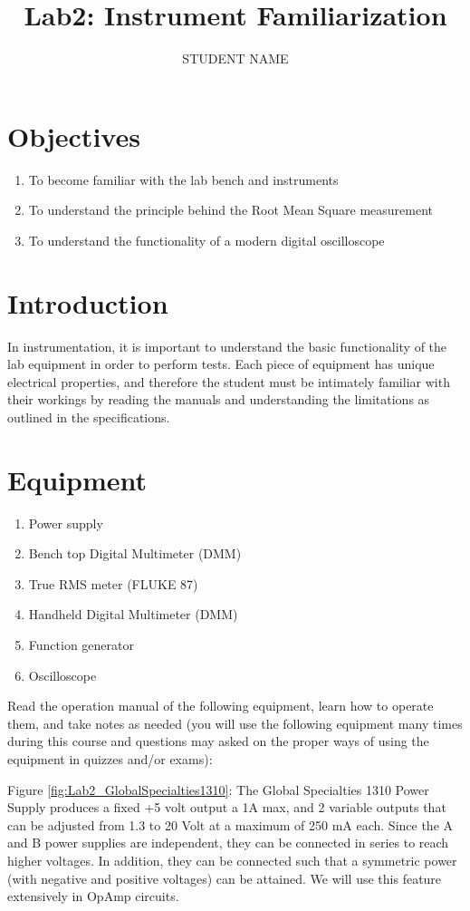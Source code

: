 \documentclass[11pt,letterpaper]{article}
\author{STUDENT NAME}
\title{Lab2: Instrument Familiarization}
\begin{document}
\maketitle

\section{Objectives}

\begin{enumerate}
\item To become familiar with the lab bench and instruments
\item To understand the principle behind the Root Mean Square measurement
\item To understand the functionality of a modern digital oscilloscope
\end{enumerate}

\section{Introduction}
In instrumentation, it is important to understand the basic functionality of the lab equipment in order to perform tests. Each piece of equipment has unique electrical properties, and therefore the student must be intimately familiar with their workings by reading the manuals and understanding the limitations as outlined in the specifications.

\section{Equipment}

\begin{enumerate}
\item Power supply
\item Bench top Digital Multimeter (DMM)
\item True RMS meter (FLUKE 87)
\item Handheld Digital Multimeter (DMM)
\item Function generator
\item Oscilloscope
\end{enumerate}

Read the operation manual of the following equipment, learn how to operate them, and take notes as needed (you will use the following equipment many times during this course and questions may asked on the proper ways of using the equipment in quizzes and/or exams):

Figure \ref{fig:Lab2_GlobalSpecialties1310}: The Global Specialties 1310 Power Supply produces a fixed +5 volt output a 1A max, and 2 variable outputs that can be adjusted from 1.3 to 20 Volt at a maximum of 250 mA each. Since the A and B power supplies are independent, they can be connected in series to reach higher voltages. In addition, they can be connected such that a symmetric power (with negative and positive voltages) can be attained. We will use this feature extensively in OpAmp circuits.\\
\end{document}
